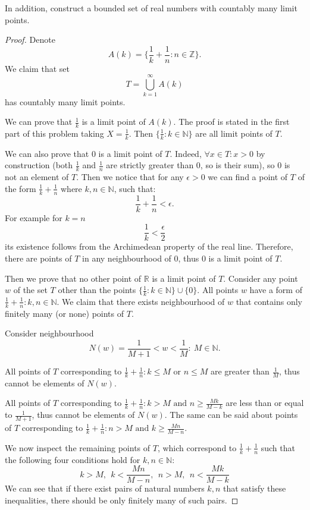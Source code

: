 \documentclass{article}
\begin{document}
\begin{tcolorbox}
In addition, construct a bounded set of real numbers with countably many limit points.
\end{tcolorbox}

\begin{proof}

Denote
$$A(k) =  \{ \dfrac{1}{k} + \dfrac{1}{n} : n \in \mathbb{Z} \}.$$
We claim that set
$$T = \bigcup_{k=1}^{\infty} A(k)$$
has countably many limit points.

We can prove that $\frac{1}{k}$ is a limit point of $A(k)$. The proof is stated in the first part of this problem taking $X = \frac{1}{k}$. Then $\{ \frac{1}{k} : k \in \mathbb{N} \}$ are all limit points of $T$.

We can also prove that $0$ is a limit point of $T$. Indeed, $\forall x \in T: x > 0$ by construction (both $\frac{1}{k}$ and $\frac{1}{n}$ are strictly greater than $0$, so is their sum), so $0$ is not an element of $T$. Then we notice that for any $\epsilon > 0$ we can find a point of $T$ of the form $\frac{1}{k} + \frac{1}{n}$ where $k,n \in \mathbb{N}$, such that:
$$\frac{1}{k} + \frac{1}{n} < \epsilon.$$
For example for $k = n$
$$\frac{1}{k} < \frac{\epsilon}{2}$$
its existence follows from the Archimedean property of the real line. Therefore, there are points of $T$ in any neighbourhood of $0$, thus $0$ is a limit point of $T$.

Then we prove that no other point of $\mathbb{R}$ is a limit point of $T$. Consider any point $w$ of the set  $T$ other than the points $\{ \frac{1}{k} : k \in \mathbb{N} \} \cup \{0\}$. All points $w$ have a form of $\frac{1}{k} + \frac{1}{n}: k,n \in \mathbb{N}$. We claim that there exists neighbourhood of $w$ that contains only finitely many (or none) points of $T$.

Consider neighbourhood
$$ N(w) = \frac{1}{M+1} < w < \frac{1}{M} : \> M\in\mathbb{N}.$$

All points of $T$ corresponding to $\frac{1}{k}+\frac{1}{n} : k \leq M \text{ or } n \leq M$ are greater than $\frac{1}{M}$, thus cannot be elements of $N(w)$.

All points of $T$ corresponding to $\frac{1}{k}+\frac{1}{n} : k > M \text{ and } n \geq \frac{Mk}{M-k}$ are less than or equal to $\frac{1}{M+1}$, thus cannot be elements of $N(w)$. The same can be said about points of $T$ corresponding to $\frac{1}{k}+\frac{1}{n} : n > M \text{ and } k \geq \frac{Mn}{M-n}$.

We now inspect the remaining points of $T$, which correspond to $\frac{1}{k}+\frac{1}{n}$ such that the following four conditions hold for $k, n \in \mathbb{N}$:
$$ k > M, \>\> k < \frac{Mn}{M-n}, \>\> n > M, \>\> n < \frac{Mk}{M-k} $$ 
We can see that if there exist pairs of natural numbers $k, n$ that satisfy these inequalities, there should be only finitely many of such pairs.


\end{proof}
\end{document}
